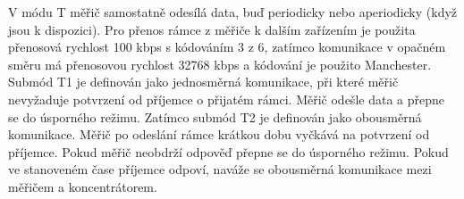 \begin{table}[!ht]
\centering
\caption{Režimy přenosu WM-Bus protokolu \cite{WmbusTables}}
\label{TableRezimy}
\end{table}


V	módu T měřič samostatně odesílá data, buď periodicky nebo aperiodicky (když jsou k dispozici). Pro přenos rámce z měřiče k dalším zařízením je použita přenosová rychlost 100 kbps s kódováním 3 z 6, zatímco komunikace v opačném směru má přenosovou rychlost 32768 kbps a kódování je použito Manchester. Submód T1 je definován jako jednosměrná komunikace, při které měřič nevyžaduje potvrzení od příjemce o přijatém rámci. Měřič odešle data a přepne se do úsporného režimu. Zatímco submód T2 je definován jako obousměrná komunikace. Měřič po odeslání rámce krátkou dobu vyčkává na potvrzení od příjemce. Pokud měřič neobdrží odpověď přepne se do úsporného režimu. Pokud ve stanoveném čase příjemce odpoví, naváže se obousměrná komunikace mezi měřičem a koncentrátorem.


